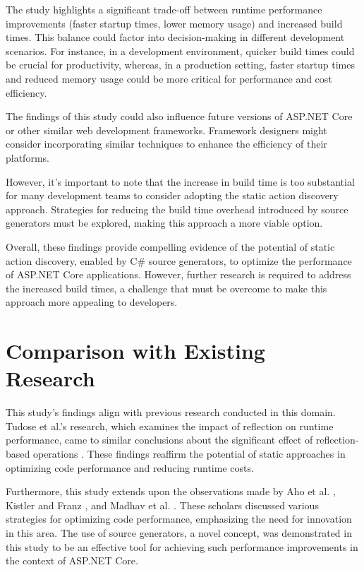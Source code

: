 The study highlights a significant trade-off between runtime performance improvements (faster startup times, lower memory usage) and increased build times. This balance could factor into decision-making in different development scenarios. For instance, in a development environment, quicker build times could be crucial for productivity, whereas, in a production setting, faster startup times and reduced memory usage could be more critical for performance and cost efficiency.

The findings of this study could also influence future versions of ASP.NET Core or other similar web development frameworks. Framework designers might consider incorporating similar techniques to enhance the efficiency of their platforms.

However, it's important to note that the increase in build time is too substantial for many development teams to consider adopting the static action discovery approach. Strategies for reducing the build time overhead introduced by source generators must be explored, making this approach a more viable option.

Overall, these findings provide compelling evidence of the potential of static action discovery, enabled by C\# source generators, to optimize the performance of ASP.NET Core applications. However, further research is required to address the increased build times, a challenge that must be overcome to make this approach more appealing to developers.


\section{Comparison with Existing Research}

This study's findings align with previous research conducted in this domain. Tudose et al.'s research, which examines the impact of reflection on runtime performance, came to similar conclusions about the significant effect of reflection-based operations \cite{Tudose2013}. These findings reaffirm the potential of static approaches in optimizing code performance and reducing runtime costs.

Furthermore, this study extends upon the observations made by Aho et al. \cite{Aho2007}, Kistler and Franz \cite{Kistler2003}, and Madhav et al. 
\cite{Shreyas2021}. These scholars discussed various strategies for optimizing code performance, emphasizing the need for innovation in this area. The use of source generators, a novel concept, was demonstrated in this study to be an effective tool for achieving such performance improvements in the context of ASP.NET Core.


